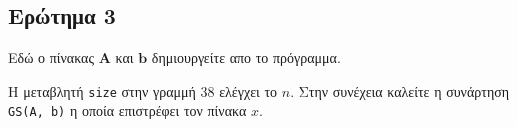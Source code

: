 \subsection{Ερώτημα 3}

Εδώ ο πίνακας $\mathbf{Α}$ και $\mathbf{b}$ δημιουργείτε απο το πρόγραμμα.

Η μεταβλητή \texttt{size} στην γραμμή 38 ελέγχει το $n$.
Στην συνέχεια καλείτε η συνάρτηση \texttt{GS(A, b)} η οποία επιστρέφει τον
πίνακα $x$.

